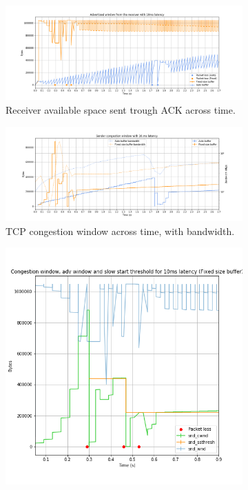 \documentclass[a4paper,10pt]{article}
\begin{document}
\begin{figure}[]
\begin{subfigure}{\textwidth}
    \centering
    \includegraphics[width=\textwidth]{images/10_wnd_comparison.png}
    \caption{Receiver available space sent trough ACK across time.}
    \label{fig:10ms_wnd}
\end{subfigure}%
\qquad
\begin{subfigure}{\textwidth}
   \centering
   \includegraphics[width=\textwidth]{images/10_cwnd_w_bandwidth.png}
    \caption{TCP congestion window across time, with bandwidth.}
    \label{fig:10ms_cwnd}
\end{subfigure}
\qquad
\begin{subfigure}{0.5\textwidth}
   \centering
   \includegraphics[width=\textwidth]{images/10_detail_windows_fixed.png}

\end{subfigure}
\end{figure}
\end{document}
